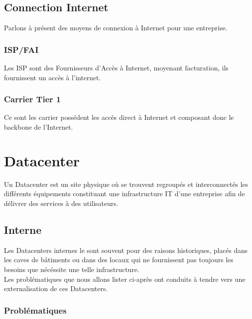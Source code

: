 \documentclass{report}
\begin{document}
	\section{Connection Internet}

		Parlons à présent des moyens de connexion à Internet pour une entreprise.\\

		\subsection{ISP/FAI}

			Les ISP sont des Fournisseurs d'Accès à Internet, moyenant facturation, ils fournissent un accès à l'internet.\\

		\subsection{Carrier Tier 1}

			Ce sont les carrier possédent les accès direct à Internet et composant donc le backbone de l'Internet.\\

\chapter{Datacenter}

	Un Datacenter est un site physique où se trouvent regroupés et interconnectés les différents équipements constituant une infrastructure IT d'une entreprise afin de délivrer des services à des utilisateurs.\\

	\section{Interne}

		Les Datacenters internes le sont souvent pour des raisons historiques, placés dans les caves de bâtiments ou dans des locaux qui ne fournissent pas toujours les besoins que nécéssite une telle infrastructure.\\
		Les problématiques que nous allons lister ci-après ont conduits à tendre vers une externalisation de ces Datacenters.\\

		\subsection{Problématiques}
\end{document}
